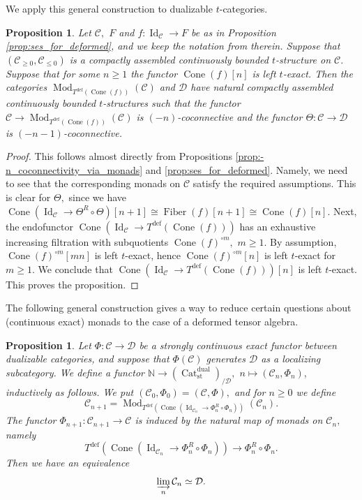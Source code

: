 \documentclass[11pt,leqno]{amsart}
\newtheorem{prop}[theo]{Proposition}
\numberwithin{equation}{section}
\def\N{\mathbb{N}}
\newcommand{\indlim}[1][]{\mathop{\varinjlim}\limits_{#1}}
\newcommand{\Cat}{\operatorname{Cat}}
\newcommand{\Cone}{\operatorname{Cone}}
\newcommand{\Fiber}{\operatorname{Fiber}}
\newcommand{\st}{\operatorname{st}}
\newcommand{\dual}{\operatorname{dual}}
\newcommand{\deff}{\operatorname{def}}
\newcommand{\cD}{{\mathcal D}}
\newcommand{\cC}{{\mathcal C}}
\newcommand{\Id}{\operatorname{Id}}
\newcommand{\Mod}{\operatorname{Mod}}
\begin{document}
We apply this general construction to dualizable $t$-categories.

\begin{prop}\label{prop:t_structures_for_deformed_tensor_algebra}
	Let $\cC,$ $F$ and $f:\Id_{\cC}\to F$ be as in Proposition \ref{prop:ses_for_deformed}, and we keep the notation from therein. Suppose that $(\cC_{\geq 0},\cC_{\leq 0})$ is a compactly assembled continuously bounded $t$-structure on $\cC.$ Suppose that for some $n\geq 1$ the functor $\Cone(f)[n]$ is left $t$-exact. Then the categories $\Mod_{T^{\deff}(\Cone(f))}(\cC)$ and $\cD$ have natural compactly assembled continuously bounded $t$-structures such that the functor $\cC\to \Mod_{T^{\deff}(\Cone(f))}(\cC)$ is $(-n)$-coconnective and the functor $\Theta:\cC\to\cD$ is $(-n-1)$-coconnective. 
\end{prop}

\begin{proof}
	This follows almost directly from Propositions \ref{prop:-n_coconnectivity_via_monads} and \ref{prop:ses_for_deformed}. Namely, we need to see that the corresponding monads on $\cC$ satisfy the required assumptions. This is clear for $\Theta,$ since we have $\Cone(\Id_{\cC}\to\Theta^R\circ\Theta)[n+1]\cong \Fiber(f)[n+1]\cong \Cone(f)[n].$ Next, the endofunctor $\Cone(\Id_{\cC}\to T^{\deff}(\Cone(f)))$ has an exhaustive increasing filtration with subquotients $\Cone(f)^{\circ m},$ $m\geq 1.$ By assumption, $\Cone(f)^{\circ m}[mn]$ is left $t$-exact, hence $\Cone(f)^{\circ m}[n]$ is left $t$-exact for $m\geq 1.$ We conclude that $\Cone(\Id_{\cC}\to T^{\deff}(\Cone(f)))[n]$ is left $t$-exact. This proves the proposition.
\end{proof}

The following general construction gives a way to reduce certain questions about (continuous exact) monads to the case of a deformed tensor algebra.

\begin{prop}\label{prop:approx_by_deformed_tensor_algebras}
Let $\Phi:\cC\to\cD$ be a strongly continuous exact functor between dualizable categories, and suppose that $\Phi(\cC)$ generates $\cD$ as a localizing subcategory. We define a functor $\N\to (\Cat_{\st}^{\dual})_{/\cD},$ $n\mapsto (\cC_n,\Phi_n),$ inductively as follows. We put $(\cC_0,\Phi_0)=(\cC,\Phi),$ and for $n\geq 0$ we define
\begin{equation*}
\cC_{n+1}=\Mod_{T^{\deff}(\Cone(\Id_{\cC_n}\to \Phi_n^R\circ \Phi_n))}(\cC_n).
\end{equation*}
The functor $\Phi_{n+1}:\cC_{n+1}\to\cC$ is induced by the natural map of monads on $\cC_n,$ namely
\begin{equation*}
T^{\deff}(\Cone(\Id_{\cC_n}\to \Phi_n^R\circ \Phi_n))\to \Phi_n^R\circ \Phi_n.
\end{equation*}
Then we have an equivalence
\begin{equation*}
\indlim[n]\cC_n\simeq \cD.
\end{equation*}
\end{prop}
\end{document}

